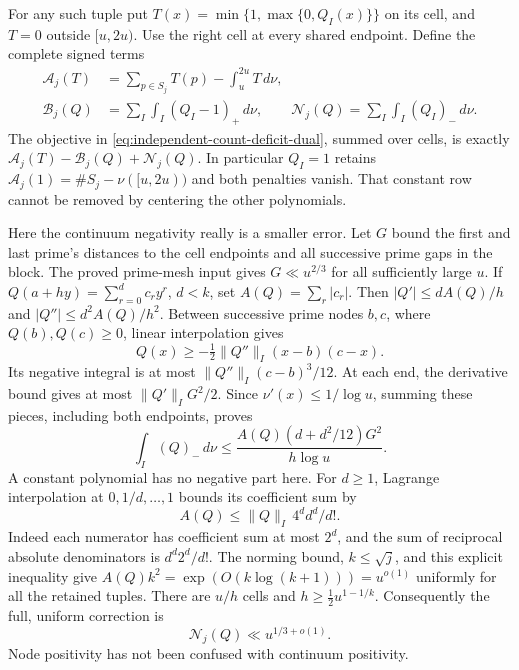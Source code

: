 \documentclass[11pt]{article}
\theoremstyle{definition}
\begin{document}
For any such tuple put $T(x)=\min\{1,\max\{0,Q_I(x)\}\}$ on
its cell, and $T=0$ outside $[u,2u)$.
Use the right cell at every shared endpoint.
Define the complete signed terms
\begin{equation}
 \begin{aligned}
 \mathcal A_j(T)&=\sum_{p\in S_j}T(p)-\int_u^{2u}T\,d\nu,\\
 \mathcal B_j(Q)&=\sum_I\int_I(Q_I-1)_+\,d\nu,\qquad
 \mathcal N_j(Q)=\sum_I\int_I(Q_I)_-\,d\nu .
 \end{aligned}
 \label{eq:independent-count-clipped-ledger}
\end{equation}
The objective in \eqref{eq:independent-count-deficit-dual},
summed over cells, is exactly
$\mathcal A_j(T)-\mathcal B_j(Q)+\mathcal N_j(Q)$.
In particular $Q_I=1$ retains
$\mathcal A_j(1)=\#S_j-\nu([u,2u))$ and both penalties vanish.
That constant row cannot be removed by centering the other
polynomials.

Here the continuum negativity really is a smaller error.
Let $G$ bound the first and last prime's distances to the
cell endpoints and all successive prime gaps in the block.
The proved prime-mesh input gives $G\ll u^{2/3}$ for all
sufficiently large $u$. If
$Q(a+hy)=\sum_{r=0}^{d}c_ry^r$, $d<k$, set
$A(Q)=\sum_r|c_r|$. Then
$|Q'|\le dA(Q)/h$ and $|Q''|\le d^2A(Q)/h^2$.
Between successive prime nodes $b,c$, where $Q(b),Q(c)\ge0$,
linear interpolation gives
\[
 Q(x)\ge-\tfrac12\|Q''\|_I(x-b)(c-x).
\]
Its negative integral is at most
$\|Q''\|_I(c-b)^3/12$.
At each end, the derivative bound gives at most
$\|Q'\|_I G^2/2$. Since $\nu'(x)\le1/\log u$, summing these
pieces, including both endpoints, proves
\begin{equation}
 \int_I(Q)_-\,d\nu
 \le \frac{A(Q)(d+d^2/12)G^2}{h\log u}.
 \label{eq:independent-count-negative-gap-bound}
\end{equation}
A constant polynomial has no negative part here.
For $d\ge1$, Lagrange interpolation at $0,1/d,\ldots,1$
bounds its coefficient sum by
\[
 A(Q)\le \|Q\|_I\,4^d d^d/d! .
\]
Indeed each numerator has coefficient sum at most $2^d$,
and the sum of reciprocal absolute denominators is
$d^d2^d/d!$.
The norming bound, $k\le\sqrt j$, and this explicit inequality
give $A(Q)k^2=\exp(O(k\log(k+1)))=u^{o(1)}$ uniformly
for all the retained tuples.
There are $u/h$ cells and $h\ge\tfrac12u^{1-1/k}$.
Consequently the full, uniform correction is
\begin{equation}
                 \mathcal N_j(Q)\ll u^{1/3+o(1)}.
 \label{eq:independent-count-subroot-negativity}
\end{equation}
Node positivity has not been confused with continuum positivity.
\end{document}
